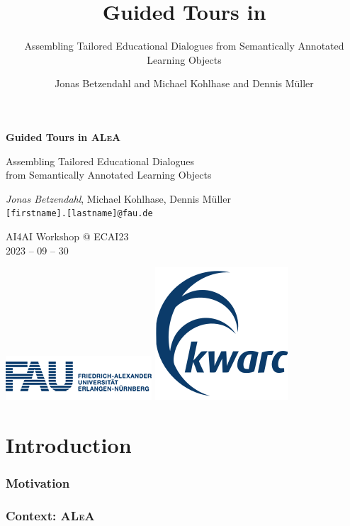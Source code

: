 \documentclass[aspectratio=169, usenames, dvipsnames]{beamer}
\author{Jonas Betzendahl and Michael Kohlhase and Dennis Müller}
\title{Guided Tours in \ALeA}
\subtitle{Assembling Tailored Educational Dialogues from Semantically Annotated Learning Objects}
\def\ALeA{\textsc{ALeA}\xspace}
\begin{document}
\begin{frame}
\begin{center}
\huge \textbf{Guided Tours in \ALeA}\medskip

\large Assembling Tailored Educational Dialogues\\ from Semantically Annotated Learning Objects

\normalsize 
\bigskip\bigskip

\large \emph{Jonas Betzendahl}, Michael Kohlhase, Dennis Müller\\
\texttt{[firstname].[lastname]@fau.de}\bigskip

\small
AI4AI Workshop @ ECAI23\\
2023 -- 09 -- 30
\medskip

\includegraphics[scale=0.5]{images/fau_logo.png}
\qquad
\includegraphics[scale=0.25]{images/kwarclogo_faublau.png} 
\end{center}
\end{frame}

\section{Introduction}

\begin{frame}
\frametitle{Motivation}
\end{frame}

\begin{frame}[fragile]
\frametitle{Context: \ALeA}

\end{frame}
\end{document}
